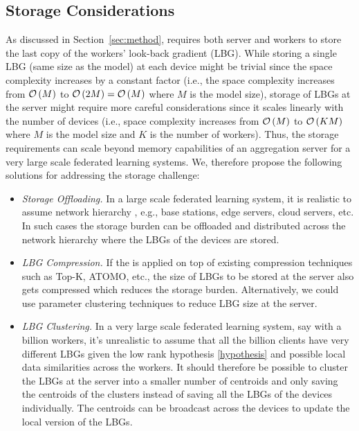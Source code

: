 \subsection{{\algName} Storage Considerations}
\label{app:storage}
As discussed in Section~\ref{sec:method}, {\algName} requires both server and workers to store the last copy of the workers' look-back gradient (LBG). While storing a single LBG (same size as the model) at each device might be trivial since the space complexity increases by a constant factor (i.e., the space complexity increases from $\mathcal{O}\left( M \right)$ to $\mathcal{O}\left( 2M \right)=\mathcal{O}\left( M \right)$ where $M$ is the model size), storage of LBGs at the server might require more careful considerations since it scales linearly with the number of devices (i.e., space complexity increases from $\mathcal{O}\left( M \right)$ to $\mathcal{O}\left( KM \right)$ where $M$ is the model size and $K$ is the number of workers). Thus, the storage requirements can scale beyond memory capabilities of an aggregation server for a very large scale federated learning systems. We, therefore propose the following solutions for addressing the storage challenge:
\begin{itemize}[leftmargin=5mm]
    \item \textit{Storage Offloading.} In a large scale federated learning system, it is realistic to assume network hierarchy \cite{hosseinalipour2020multi}, e.g., base stations, edge servers, cloud servers, etc. In such cases the storage burden can be offloaded and distributed across the network hierarchy where the LBGs of the devices are stored.
    \item \textit{LBG Compression.} If the {\algName} is applied on top of existing compression techniques such as Top-K, ATOMO, etc., the size of LBGs to be stored at the server also gets compressed which reduces the storage burden. Alternatively, we could use parameter clustering techniques \citep{son2018clustering,cho2021dkm} to reduce LBG size at the server.
    \item \textit{LBG Clustering.} In a very large scale federated learning system, say with a billion workers, it's unrealistic to assume that all the billion clients have very different LBGs given the low rank hypothesis \eqref{hypothesis} and possible local data similarities across the workers. It should therefore be possible to cluster the LBGs at the server into a smaller number of centroids and only saving the centroids of the clusters instead of saving all the LBGs of the devices individually. The centroids can be broadcast across the devices to update the local version of the LBGs.
\end{itemize}

